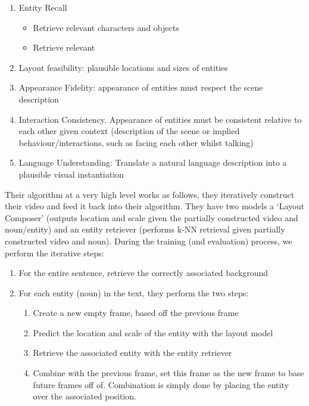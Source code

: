 \documentclass{article}
\begin{document}
\begin{enumerate}
    \item Entity Recall
        \begin{itemize}
            \item Retrieve relevant characters and objects
            \item Retrieve relevant 
        \end{itemize}
    \item Layout feasibility: plausible locations and sizes of entities
    \item Appearance Fidelity: appearance of entities must respect the scene description
    \item Interaction Consistency. Appearance of entities must be consistent relative to each other given context (description of the scene or implied behaviour/interactions, 
        such as facing each other whilst talking)
    \item Language Understanding: Translate a natural language description into a plausible visual instantiation
\end{enumerate}

Their algorithm at a very high level works as follows, they iteratively construct their video and feed it back into their algorithm. They have
two models a `Layout Composer' (outputs location and scale given the partially constructed video and noun/entity) and 
an entity retriever (performs k-NN retrieval given partially constructed video and noun). During the training (and evaluation) process, we perform the iterative steps:

\begin{enumerate}
    \item For the entire sentence, retrieve the correctly associated background
    \item For each entity (noun) in the text, they perform the two steps:
        \begin{enumerate}
            \item Create a new empty frame, based off the previous frame
            \item Predict the location and scale of the entity with the layout model
            \item Retrieve the associated entity with the entity retriever
            \item Combine with the previous frame, set this frame as the new frame to base future frames off of. Combination is simply done by placing the entity over the associated position.
        \end{enumerate}
\end{enumerate}
\end{document}

